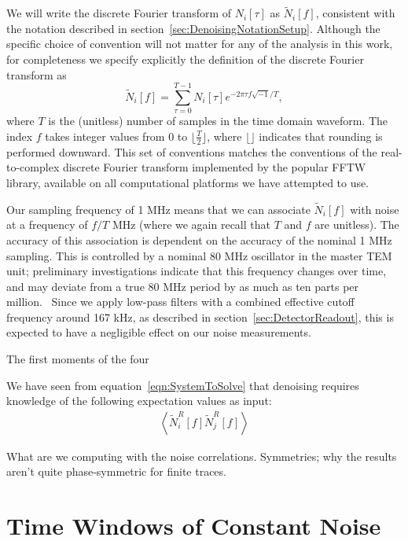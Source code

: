 We will write the discrete Fourier transform of $N_i[\tau]$ as $\widetilde{N}_i[f]$, consistent with the notation described in section~\ref{sec:DenoisingNotationSetup}.  Although the specific choice of convention will not matter for any of the analysis in this work, for completeness we specify explicitly the definition of the discrete Fourier transform as
\begin{equation}
\widetilde{N}_i[f] = \sum_{\tau = 0}^{T-1} N_i[\tau] e^{-2\pi \tau f \sqrt{-1}/T},
\end{equation}
where $T$ is the (unitless) number of samples in the time domain waveform.  The index $f$ takes integer values from 0 to $\lfloor \frac{T}{2} \rfloor$, where $\lfloor\rfloor$ indicates that rounding is performed downward.  This set of conventions matches the conventions of the real-to-complex discrete Fourier transform implemented by the popular FFTW library, available on all computational platforms we have attempted to use.~\cite{FFTW05}

Our sampling frequency of 1 MHz means that we can associate $\widetilde{N}_i[f]$ with noise at a frequency of $f/T$ MHz (where we again recall that $T$ and $f$ are unitless).  The accuracy of this association is dependent on the accuracy of the nominal 1 MHz sampling.  This is controlled by a nominal 80 MHz oscillator in the master TEM unit; preliminary investigations indicate that this frequency changes over time, and may deviate from a true 80 MHz period by as much as ten parts per million.~\cite{DAQWeirdDetails,EXOElectronicsFunctionalSpecification}  Since we apply low-pass filters with a combined effective cutoff frequency around 167 kHz, as described in section~\ref{sec:DetectorReadout}, this is expected to have a negligible effect on our noise measurements.


The first moments of the four



We have seen from equation~\ref{eqn:SystemToSolve} that denoising requires knowledge of the following expectation values as input:
\begin{align}
\left<\widetilde{N}^R_i[f]\widetilde{N}^R_j[f]\right>
\end{align}



What are we computing with the noise correlations.
Symmetries; why the results aren't quite phase-symmetric for finite traces.

\section{Time Windows of Constant Noise}\label{sec:NoiseCorrelationsTimeWindows}

